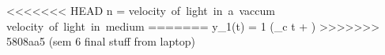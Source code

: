 <<<<<<< HEAD
n = {velocity\ of\ light\ in\ a\ vaccum \over velocity\ of\ light\ in\ medium}
=======
y_1(t) = {1\over {}} \cdot \cos(\omega_c t + {\pi {}})
>>>>>>> 5808aa5 (sem 6 final stuff from laptop)
